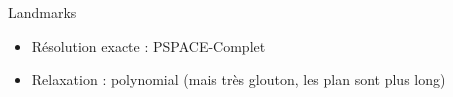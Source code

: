 \begin{frame}
  \begin{block}{Landmarks}
    \begin{itemize}
      \item Résolution exacte : PSPACE-Complet
      \item Relaxation : polynomial (mais très glouton, les plan sont plus long)

      
    \end{itemize}
  \end{block}
\end{frame}
